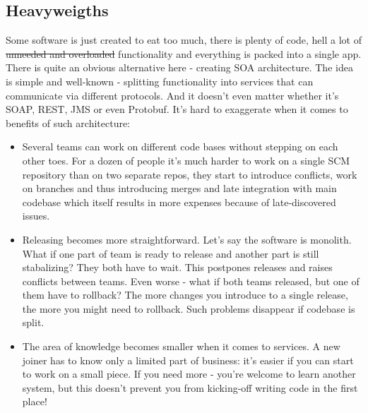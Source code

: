 \documentclass[11pt,a4paper,oneside]{article}
\begin{document}
\subsection{Heavyweigths}
Some software is just created to eat too much, there is plenty of code, hell a lot of \sout{unneeded and overloaded} functionality and everything is packed into a single app. There is quite an obvious alternative here - creating SOA architecture. The idea is simple and well-known - splitting functionality into services that can communicate via different protocols. And it doesn't even matter whether it's SOAP, REST, JMS or even Protobuf. It's hard to exaggerate when it comes to benefits of such architecture:
\begin{itemize}
  \item Several teams can work on different code bases without stepping on each other toes. For a dozen of people it's much harder to work on a single SCM repository than on two separate repos, they start to introduce conflicts, work on branches and thus introducing merges and late integration with main codebase which itself results in more expenses because of late-discovered issues.
  \item Releasing becomes more straightforward. Let's say the software is monolith. What if one part of team is ready to release and another part is still stabalizing? They both have to wait. This postpones releases and raises conflicts between teams. Even worse - what if both teams released, but one of them have to rollback? The more changes you introduce to a single release, the more you might need to rollback. Such problems disappear if codebase is split.
  \item The area of knowledge becomes smaller when it comes to services. A new joiner has to know only a limited part of business: it's easier if you can start to work on a small piece. If you need more - you're welcome to learn another system, but this doesn't prevent you from kicking-off writing code in the first place!
\end{itemize}
\end{document}

